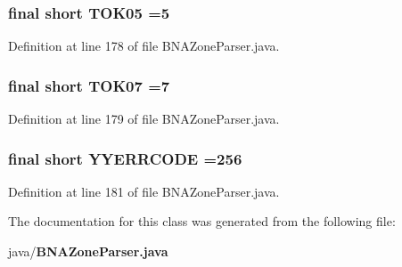 \subsubsection[{T\+O\+K05}]{\setlength{\rightskip}{0pt plus 5cm}final short T\+O\+K05 =5\hspace{0.3cm}{\ttfamily [static]}}\label{classorg_1_1smallfoot_1_1parser_1_1zone_1_1BNAZoneParser_a6cdf016becc8cc687612ded338623bfc}


Definition at line 178 of file B\+N\+A\+Zone\+Parser.\+java.

\subsubsection[{T\+O\+K07}]{\setlength{\rightskip}{0pt plus 5cm}final short T\+O\+K07 =7\hspace{0.3cm}{\ttfamily [static]}}\label{classorg_1_1smallfoot_1_1parser_1_1zone_1_1BNAZoneParser_aaef5d04e154fb070f09d2255a2ab594f}


Definition at line 179 of file B\+N\+A\+Zone\+Parser.\+java.

\subsubsection[{Y\+Y\+E\+R\+R\+C\+O\+D\+E}]{\setlength{\rightskip}{0pt plus 5cm}final short Y\+Y\+E\+R\+R\+C\+O\+D\+E =256\hspace{0.3cm}{\ttfamily [static]}}\label{classorg_1_1smallfoot_1_1parser_1_1zone_1_1BNAZoneParser_a1c58472ea6621d2f613831e08d10dba3}


Definition at line 181 of file B\+N\+A\+Zone\+Parser.\+java.



The documentation for this class was generated from the following file\+:\begin{DoxyCompactItemize}
\item 
java/{\bf B\+N\+A\+Zone\+Parser.\+java}\end{DoxyCompactItemize}
